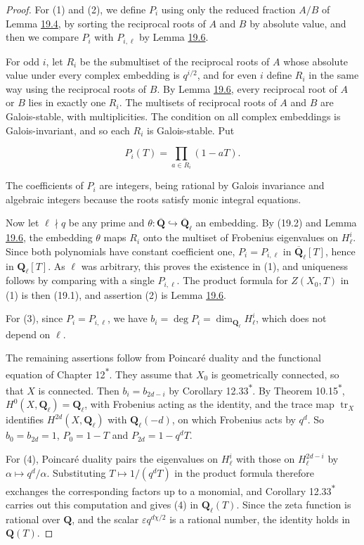 \documentclass[11pt]{article}
\newcommand{\bpout}[1]{#1\textsuperscript{\hyperlink{bp-outside}{\ensuremath{\ast}}}}
\begin{document}
\begin{proof}[{Proof}]\label{bp25}%
For (1) and (2), we define \(P_i\) using only the reduced fraction \(A/B\) of Lemma \hyperref[bp15]{19.4}, by sorting the reciprocal roots of \(A\) and \(B\) by absolute value, and then we compare \(P_i\) with \(P_{i,\ell}\) by Lemma \hyperref[bp22]{19.6}.

For odd \(i\), let \(R_i\) be the submultiset of the reciprocal roots of \(A\) whose absolute value under every complex embedding is \(q^{i/2}\), and for even \(i\) define \(R_i\) in the same way using the reciprocal roots of \(B\). By Lemma \hyperref[bp22]{19.6}, every reciprocal root of \(A\) or \(B\) lies in exactly one \(R_i\). The multisets of reciprocal roots of \(A\) and \(B\) are Galois-stable, with multiplicities. The condition on all complex embeddings is Galois-invariant, and so each \(R_i\) is Galois-stable. Put

\[
P_i(T)=\prod_{a\in R_i}(1-aT).
\]

The coefficients of \(P_i\) are integers, being rational by Galois invariance and algebraic integers because the roots satisfy monic integral equations.

Now let \(\ell\nmid q\) be any prime and \(\theta:\overline{\mathbf Q}\hookrightarrow\overline{\mathbf Q}_\ell\) an embedding. By (19.2) and Lemma \hyperref[bp22]{19.6}, the embedding \(\theta\) maps \(R_i\) onto the multiset of Frobenius eigenvalues on \(H^i_\ell\). Since both polynomials have constant coefficient one, \(P_i=P_{i,\ell}\) in \(\overline{\mathbf Q}_\ell[T]\), hence in \(\mathbf Q_\ell[T]\). As \(\ell\) was arbitrary, this proves the existence in (1), and uniqueness follows by comparing with a single \(P_{i,\ell}\). The product formula for \(Z(X_0,T)\) in (1) is then (19.1), and assertion (2) is Lemma \hyperref[bp22]{19.6}.

For (3), since \(P_i=P_{i,\ell}\), we have \(b_i=\deg P_i=\dim_{\mathbf Q_\ell}H^i_\ell\), which does not depend on \(\ell\).

The remaining assertions follow from Poincaré duality and the functional equation of Chapter \bpout{12}. They assume that \(X_0\) is geometrically connected, so that \(X\) is connected. Then \(b_i=b_{2d-i}\) by Corollary \bpout{12.33}. By Theorem \bpout{10.15}, \(H^0(X,\mathbf Q_\ell)=\mathbf Q_\ell\), with Frobenius acting as the identity, and the trace map \(\operatorname{tr}_X\) identifies \(H^{2d}(X,\mathbf Q_\ell)\) with \(\mathbf Q_\ell(-d)\), on which Frobenius acts by \(q^d\). So \(b_0=b_{2d}=1\), \(P_0=1-T\) and \(P_{2d}=1-q^dT\).

For (4), Poincaré duality pairs the eigenvalues on \(H^i_\ell\) with those on \(H^{2d-i}_\ell\) by \(\alpha\mapsto q^d/\alpha\). Substituting \(T\mapsto1/(q^dT)\) in the product formula therefore exchanges the corresponding factors up to a monomial, and Corollary \bpout{12.33} carries out this computation and gives (4) in \(\mathbf Q_\ell(T)\). Since the zeta function is rational over \(\mathbf Q\), and the scalar \(\varepsilon q^{d\chi/2}\) is a rational number, the identity holds in \(\mathbf Q(T)\).
\end{proof}
\end{document}
